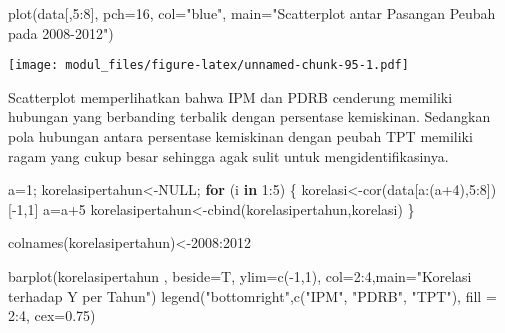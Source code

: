 \documentclass[
]{book}
\newenvironment{Shaded}{\begin{snugshade}}{\end{snugshade}}
\newcommand{\AttributeTok}[1]{\textcolor[rgb]{0.77,0.63,0.00}{#1}}
\newcommand{\ConstantTok}[1]{\textcolor[rgb]{0.00,0.00,0.00}{#1}}
\newcommand{\ControlFlowTok}[1]{\textcolor[rgb]{0.13,0.29,0.53}{\textbf{#1}}}
\newcommand{\DecValTok}[1]{\textcolor[rgb]{0.00,0.00,0.81}{#1}}
\newcommand{\FloatTok}[1]{\textcolor[rgb]{0.00,0.00,0.81}{#1}}
\newcommand{\FunctionTok}[1]{\textcolor[rgb]{0.00,0.00,0.00}{#1}}
\newcommand{\NormalTok}[1]{#1}
\newcommand{\OtherTok}[1]{\textcolor[rgb]{0.56,0.35,0.01}{#1}}
\newcommand{\SpecialCharTok}[1]{\textcolor[rgb]{0.00,0.00,0.00}{#1}}
\newcommand{\StringTok}[1]{\textcolor[rgb]{0.31,0.60,0.02}{#1}}
\begin{document}
\begin{Shaded}
\begin{Highlighting}[]
\FunctionTok{plot}\NormalTok{(data[,}\DecValTok{5}\SpecialCharTok{:}\DecValTok{8}\NormalTok{], }\AttributeTok{pch=}\DecValTok{16}\NormalTok{, }\AttributeTok{col=}\StringTok{"blue"}\NormalTok{, }\AttributeTok{main=}\StringTok{"Scatterplot antar Pasangan Peubah pada 2008{-}2012"}\NormalTok{)}
\end{Highlighting}
\end{Shaded}

\texttt{[image: modul\_files/figure-latex/unnamed-chunk-95-1.pdf]}

Scatterplot memperlihatkan bahwa IPM dan PDRB cenderung memiliki hubungan yang berbanding terbalik dengan persentase kemiskinan. Sedangkan pola hubungan antara persentase kemiskinan dengan peubah TPT memiliki ragam yang cukup besar sehingga agak sulit untuk mengidentifikasinya.

\begin{Shaded}
\begin{Highlighting}[]
\NormalTok{a}\OtherTok{=}\DecValTok{1}\NormalTok{; korelasipertahun}\OtherTok{\textless{}{-}}\ConstantTok{NULL}\NormalTok{;}
\ControlFlowTok{for}\NormalTok{ (i }\ControlFlowTok{in} \DecValTok{1}\SpecialCharTok{:}\DecValTok{5}\NormalTok{)}
\NormalTok{\{}
\NormalTok{  korelasi}\OtherTok{\textless{}{-}}\FunctionTok{cor}\NormalTok{(data[a}\SpecialCharTok{:}\NormalTok{(a}\SpecialCharTok{+}\DecValTok{4}\NormalTok{),}\DecValTok{5}\SpecialCharTok{:}\DecValTok{8}\NormalTok{])[}\SpecialCharTok{{-}}\DecValTok{1}\NormalTok{,}\DecValTok{1}\NormalTok{]}
\NormalTok{  a}\OtherTok{=}\NormalTok{a}\SpecialCharTok{+}\DecValTok{5}
\NormalTok{  korelasipertahun}\OtherTok{\textless{}{-}}\FunctionTok{cbind}\NormalTok{(korelasipertahun,korelasi)}
\NormalTok{\}}

\FunctionTok{colnames}\NormalTok{(korelasipertahun)}\OtherTok{\textless{}{-}}\DecValTok{2008}\SpecialCharTok{:}\DecValTok{2012}

\FunctionTok{barplot}\NormalTok{(korelasipertahun , }\AttributeTok{beside=}\NormalTok{T, }\AttributeTok{ylim=}\FunctionTok{c}\NormalTok{(}\SpecialCharTok{{-}}\DecValTok{1}\NormalTok{,}\DecValTok{1}\NormalTok{), }\AttributeTok{col=}\DecValTok{2}\SpecialCharTok{:}\DecValTok{4}\NormalTok{,}\AttributeTok{main=}\StringTok{"Korelasi terhadap Y per Tahun"}\NormalTok{)}
\FunctionTok{legend}\NormalTok{(}\StringTok{"bottomright"}\NormalTok{,}\FunctionTok{c}\NormalTok{(}\StringTok{"IPM"}\NormalTok{, }\StringTok{"PDRB"}\NormalTok{, }\StringTok{"TPT"}\NormalTok{),}
\AttributeTok{fill =} \DecValTok{2}\SpecialCharTok{:}\DecValTok{4}\NormalTok{, }\AttributeTok{cex=}\FloatTok{0.75}\NormalTok{)}
\end{Highlighting}
\end{Shaded}
\end{document}
